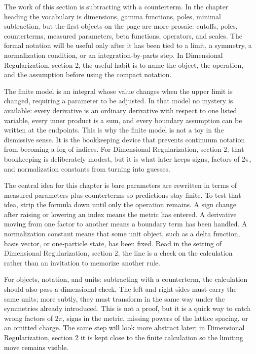 The work of this section is subtracting with a counterterm.  In the chapter heading the vocabulary is dimensions, gamma functions, poles, minimal subtraction, but the first objects on the page are more prosaic: cutoffs, poles, counterterms, measured parameters, beta functions, operators, and scales.  The formal notation will be useful only after it has been tied to a limit, a symmetry, a normalization condition, or an integration-by-parts step.  In Dimensional Regularization, section 2, the useful habit is to name the object, the operation, and the assumption before using the compact notation.

The finite model is an integral whose value changes when the upper limit is changed, requiring a parameter to be adjusted.  In that model no mystery is available: every derivative is an ordinary derivative with respect to one listed variable, every inner product is a sum, and every boundary assumption can be written at the endpoints.  This is why the finite model is not a toy in the dismissive sense.  It is the bookkeeping device that prevents continuum notation from becoming a fog of indices.  For Dimensional Regularization, section 2, that bookkeeping is deliberately modest, but it is what later keeps signs, factors of \(2\pi\), and normalization constants from turning into guesses.

The central idea for this chapter is bare parameters are rewritten in terms of measured parameters plus counterterms so predictions stay finite.  To test that idea, strip the formula down until only the operation remains.  A sign change after raising or lowering an index means the metric has entered.  A derivative moving from one factor to another means a boundary term has been handled.  A normalization constant means that some unit object, such as a delta function, basis vector, or one-particle state, has been fixed.  Read in the setting of Dimensional Regularization, section 2, the line is a check on the calculation rather than an invitation to memorize another rule.

For objects, notation, and units: subtracting with a counterterm, the calculation should also pass a dimensional check.  The left and right sides must carry the same units; more subtly, they must transform in the same way under the symmetries already introduced.  This is not a proof, but it is a quick way to catch wrong factors of \(2\pi\), signs in the metric, missing powers of the lattice spacing, or an omitted charge.  The same step will look more abstract later; in Dimensional Regularization, section 2 it is kept close to the finite calculation so the limiting move remains visible.

